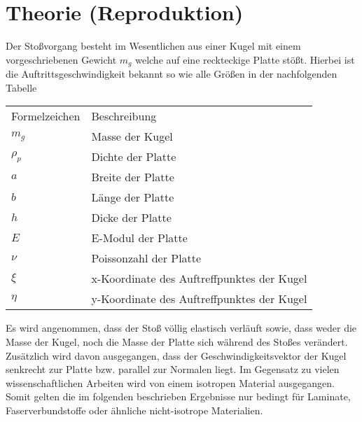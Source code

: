 \chapter{Theorie (Reproduktion)}
\label{chap:Principles}

Der Stoßvorgang besteht im Wesentlichen aus einer Kugel mit einem vorgeschriebenen Gewicht $m_g$ welche auf eine reckteckige Platte stößt. Hierbei ist die Auftrittsgeschwindigkeit bekannt so wie alle Größen in der nachfolgenden Tabelle

\begin{center}
\begin{tabular}[h]{l | l}	
	Formelzeichen & Beschreibung \\
	$m_g$ & Masse der Kugel \\
	$\rho_p$ & Dichte der Platte\\
	$a$ & Breite der Platte\\
	$b$ & Länge der Platte\\
	$h$ & Dicke der Platte \\
	$E$ & E-Modul der Platte \\
	$\nu$ & Poissonzahl der Platte \\
	$\xi$ & x-Koordinate des Auftreffpunktes der Kugel \\
	$\eta$ & y-Koordinate des Auftreffpunktes der Kugel \\
\end{tabular}
\end{center}

Es wird angenommen, dass der Stoß völlig elastisch verläuft sowie, dass weder die Masse der Kugel, noch die Masse der Platte sich während des Stoßes verändert.
Zusätzlich wird davon ausgegangen, dass der Geschwindigkeitsvektor der Kugel senkrecht zur Platte bzw. parallel zur Normalen liegt. Im Gegensatz zu vielen wissenschaftlichen Arbeiten wird von einem isotropen Material ausgegangen. Somit gelten die im folgenden beschrieben Ergebnisse nur bedingt für Laminate, Faserverbundstoffe oder ähnliche nicht-isotrope Materialien. 


